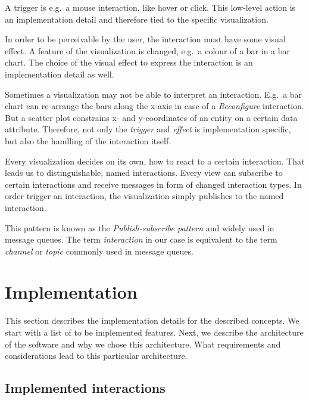 \documentclass{article}
\begin{document}
A trigger is e.g.\ a mouse interaction, like hover or click.
This low-level action is an implementation detail and therefore tied to the specific visualization.

In order to be perceivable by the user, the interaction must have some visual effect.
A feature of the visualization is changed, e.g.\ a colour of a bar in a bar chart.
The choice of the visual effect to express the interaction is an implementation detail as well.

Sometimes a visualization may not be able to interpret an interaction.
E.g.\ a bar chart can re-arrange the bars along the x-axis in case of a \emph{Reconfigure} interaction.
But a scatter plot constrains x- and y-coordinates of an entity on a certain data attribute.
Therefore, not only the \emph{trigger} and \emph{effect} is implementation specific, but also the handling of the interaction itself.

Every visualization decides on its own, how to react to a certain interaction.
That leads us to distinguishable, named interactions.
Every view can subscribe to certain interactions and receive messages in form of changed interaction types.
In order trigger an interaction, the visualization simply publishes to the named interaction.

This pattern is known as the \emph{Publish-subscribe pattern} and widely used in message queues.
The term \emph{interaction} in our case is equivalent to the term \emph{channel} or \emph{topic} commonly used in message queues.


\clearpage
\section{Implementation}

This section describes the implementation details for the described concepts.
We start with a list of to be implemented features.
Next, we describe the architecture of the software and why we chose this architecture.
What requirements and considerations lead to this particular architecture.


\subsection{Implemented interactions}
\end{document}
